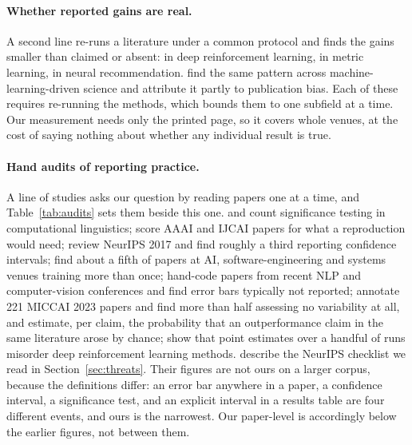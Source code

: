 \documentclass{article}
\begin{document}
\paragraph{Whether reported gains are real.} A second line re-runs a
literature under a common protocol and finds the gains smaller than claimed or
absent: \citet{henderson2017deep} in deep reinforcement learning,
\citet{musgrave2020metric} in metric learning, \citet{dacrema2019really} in
neural recommendation. \citet{saidi2024unraveling} find the same pattern across
machine-learning-driven science and attribute it partly to publication bias.
Each of these requires re-running the methods, which bounds them to one subfield
at a time. Our measurement needs only the printed page, so it covers whole
venues, at the cost of saying nothing about whether any individual result is
true.

\paragraph{Hand audits of reporting practice.} A line of studies asks our
question by reading papers one at a time, and Table~\ref{tab:audits} sets them
beside this one. \citet{bergkirkpatrick2012empirical} and \citet{dror2018hitchhiker}
count significance testing in computational linguistics; \citet{gundersen2018state}
score AAAI and IJCAI papers for what a reproduction would need;
\citet{kirly2018nips} review NeurIPS 2017 and find roughly a third reporting
confidence intervals; \citet{pham2020problems} find about a fifth of papers at
AI, software-engineering and systems venues training more than once;
\citet{hutchinson2022evaluation} hand-code papers from recent NLP and computer-vision
conferences and find error bars typically not reported;
\citet{christodoulou2024confidence} annotate 221 MICCAI 2023 papers and find
more than half assessing no variability at all, and
\citet{christodoulou2025false} estimate, per claim, the probability that an
outperformance claim in the same literature arose by chance;
\citet{agarwal2021deep} show that point estimates over a handful of runs
misorder deep reinforcement learning methods. \citet{pineau2021improving}
describe the NeurIPS checklist we read in Section~\ref{sec:threats}. Their
figures are not ours on a larger corpus, because the definitions differ: an
error bar anywhere in a paper, a confidence interval, a significance test, and
an explicit interval in a results table are four different events, and ours is
the narrowest. Our paper-level \nPctWithErrorBar{} is accordingly below the
earlier figures, not between them.
\end{document}
